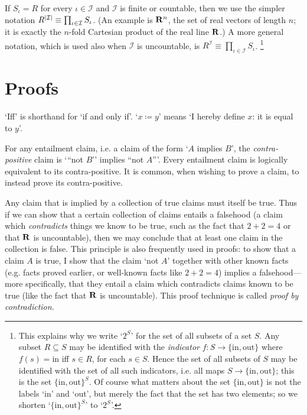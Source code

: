\documentclass[11pt,letterpaper,reqno,oneside]{book}
\begin{document}
\begin{appendices}
If $S_\iota = R$ for every $\iota \in \mathcal{I}$ and $\mathcal{I}$ is finite or countable, then we use the simpler notation $R^{\abs*{\mathcal{I}}} \equiv \prod_{\iota \in \mathcal{I}} S_\iota$.
(An example is $\mathbf{R}^n$, the set of real vectors of length $n$; it is exactly the $n$-fold Cartesian product of the real line $\mathbf{R}$.)
A more general notation, which is used also when $\mathcal{I}$ is uncountable, is $R^\mathcal{I} \equiv \prod_{\iota \in \mathcal{I}} S_\iota$.%
	\footnote{This explains why we write `$2^S$' for the set of all subsets of a set $S$. Any subset $R \subseteq S$ may be identified with the \emph{indicator} $f : S \to \{\text{in},\text{out}\}$ where $f(s)=\text{in}$ iff $s \in R$, for each $s \in S$. Hence the set of all subsets of $S$ may be identified with the set of all such indicators, i.e. all maps $S \to \{\text{in},\text{out}\}$; this is the set $\{\text{in},\text{out}\}^S$. Of course what matters about the set $\{\text{in},\text{out}\}$ is not the labels `in' and `out', but merely the fact that the set has two elements; so we shorten `$\{\text{in},\text{out}\}^S$' to `$2^S$'.}



\section{Proofs}
\label{math:pf}

`Iff' is shorthand for `if and only if'. `$x \coloneqq y$' means `I hereby define $x$: it is equal to $y$'.

For any entailment claim, i.e. a claim of the form `$A$ implies $B$', the \emph{contra-positive} claim is `{``}not $B$'' implies ``not $A${''}'. Every entailment claim is logically equivalent to its contra-positive. It is common, when wishing to prove a claim, to instead prove its contra-positive.

Any claim that is implied by a collection of true claims must itself be true. Thus if we can show that a certain collection of claims entails a falsehood (a claim which \emph{contradicts} things we know to be true, such as the fact that $2+2=4$ or that $\mathbf{R}$ is uncountable), then we may conclude that at least one claim in the collection is false. This principle is also frequently used in proofs: to show that a claim $A$ is true, I show that the claim `not $A$' together with other known facts (e.g. facts proved earlier, or well-known facts like $2+2=4$) implies a falsehood---more specifically, that they entail a claim which contradicts claims known to be true (like the fact that $\mathbf{R}$ is uncountable). This proof technique is called \emph{proof by contradiction.}


\end{appendices}
\end{document}

